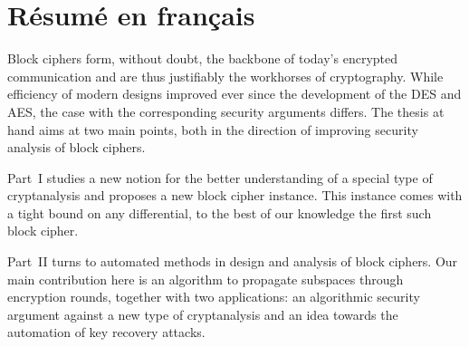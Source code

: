 \chapter*{Résumé en français}

Block ciphers form, without doubt, the backbone of today's encrypted communication and are thus justifiably the workhorses of cryptography.
While efficiency of modern designs improved ever since the development of the DES and AES, the case with the corresponding security arguments differs.
The thesis at hand aims at two main points, both in the direction of improving security analysis of block ciphers.

Part~I studies a new notion for the better understanding of a special type of cryptanalysis and proposes a new block cipher instance.
This instance comes with a tight bound on any differential, to the best of our knowledge the first such block cipher.

Part~II turns to automated methods in design and analysis of block ciphers.
Our main contribution here is an algorithm to propagate subspaces through encryption rounds, together with two applications: an algorithmic security argument against a new type of cryptanalysis and an idea towards the automation of key recovery attacks.
